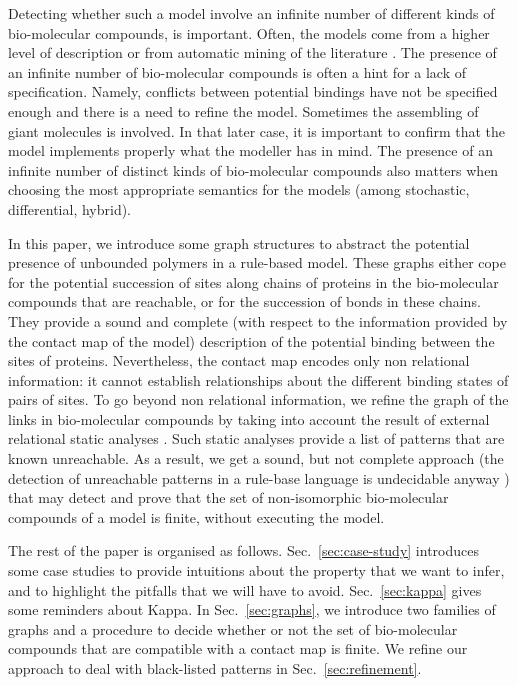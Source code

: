 \documentclass{entcs}
\begin{document}
Detecting whether such a model involve an infinite number of different kinds of bio-molecular compounds, is important. Often, the models come from a higher level of description \cite{DBLP:conf/cmsb/HarmerCLO17} or from automatic mining of the literature \cite{Gyori119834}. The presence of an infinite number of bio-molecular compounds is often a hint for a lack of specification. Namely, conflicts between potential bindings have not be specified enough and there is a need to refine the model. Sometimes the assembling of giant molecules is involved. In that later case, it is important to confirm that the model implements properly what the modeller has in mind. The presence of an infinite number of distinct kinds of bio-molecular compounds also matters when choosing the most appropriate semantics for the models  (among stochastic, differential, hybrid).

In this paper, we introduce some graph structures to abstract the potential presence of unbounded polymers in a rule-based model. These graphs either cope for the potential succession of sites along chains of proteins in the bio-molecular compounds that are reachable, or for the succession of bonds in these chains. They provide a sound and complete (with respect to the information provided by the contact map of the model) description of the potential binding between the sites of proteins.
Nevertheless, the contact map encodes only non relational information: it cannot establish relationships about the different binding states of pairs of sites. To go beyond non relational information, we refine the graph of the links  in bio-molecular compounds by taking into account the result of external relational static analyses \cite{DanosEtAl-VMCAI08,SASB2016,KaSa}. Such static analyses provide a list of patterns that are known unreachable. As a result, we get a sound, but not complete approach (the detection of unreachable patterns in a rule-base language is undecidable anyway \cite{kreyBig}) that may detect and prove that the set of non-isomorphic bio-molecular compounds of a model is finite, without executing the model.

The rest of the paper is organised as follows.
Sec.~\ref{sec:case-study} introduces some case studies to provide intuitions about the property that we want to infer, and to highlight the pitfalls that we will have to avoid. Sec.~\ref{sec:kappa} gives some reminders about Kappa.
In Sec.~\ref{sec:graphs}, we introduce two families of graphs and a procedure to decide whether or not the set of bio-molecular compounds that are compatible with a contact map is finite. We refine our approach to deal with black-listed patterns in Sec.~\ref{sec:refinement}.
\end{document}
